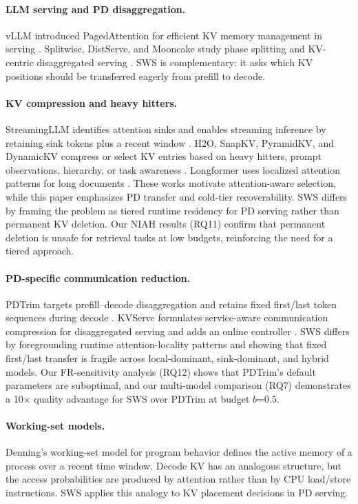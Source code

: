 \documentclass[11pt]{article}
\newcommand{\method}{SWS}
\newcommand{\sws}{SWS}
\theoremstyle{definition}
\theoremstyle{plain}
\begin{document}
\paragraph{LLM serving and PD disaggregation.}
vLLM introduced PagedAttention for efficient KV memory management in serving \citep{vllm}.  Splitwise, DistServe, and Mooncake study phase splitting and KV-centric disaggregated serving \citep{splitwise,distserve,mooncake}.  \method{} is complementary: it asks which KV positions should be transferred eagerly from prefill to decode.

\paragraph{KV compression and heavy hitters.}
StreamingLLM identifies attention sinks and enables streaming inference by retaining sink tokens plus a recent window \citep{streamingllm}.  H2O, SnapKV, PyramidKV, and DynamicKV compress or select KV entries based on heavy hitters, prompt observations, hierarchy, or task awareness \citep{h2o,snapkv,pyramidkv,dynamickv}.  Longformer uses localized attention patterns for long documents \citep{longformer}.  These works motivate attention-aware selection, while this paper emphasizes PD transfer and cold-tier recoverability.  \method{} differs by framing the problem as tiered runtime residency for PD serving rather than permanent KV deletion.  Our NIAH results (RQ11) confirm that permanent deletion is unsafe for retrieval tasks at low budgets, reinforcing the need for a tiered approach.

\paragraph{PD-specific communication reduction.}
PDTrim targets prefill--decode disaggregation and retains fixed first/last token sequences during decode \citep{pdtrim}.  KVServe formulates service-aware communication compression for disaggregated serving and adds an online controller \citep{kvserve}.  \method{} differs by foregrounding runtime attention-locality patterns and showing that fixed first/last transfer is fragile across local-dominant, sink-dominant, and hybrid models.  Our FR-sensitivity analysis (RQ12) shows that PDTrim's default parameters are suboptimal, and our multi-model comparison (RQ7) demonstrates a 10$\times$ quality advantage for \sws{} over PDTrim at budget $b$=0.5.

\paragraph{Working-set models.}
Denning's working-set model for program behavior \citep{denning1968working} defines the active memory of a process over a recent time window.  Decode KV has an analogous structure, but the access probabilities are produced by attention rather than by CPU load/store instructions.  \method{} applies this analogy to KV placement decisions in PD serving.
\end{document}
